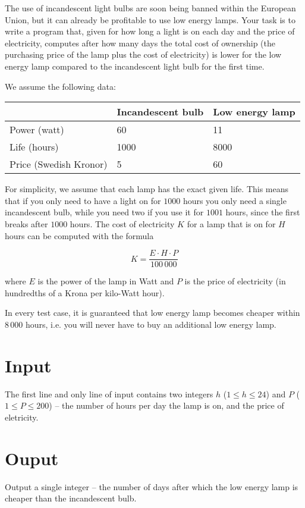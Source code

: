 The use of incandescent light bulbs are soon being banned within the European Union, but it can already be profitable to use low energy lamps.
Your task is to write a program that, given for how long a light is on each day and the price of electricity, computes after how many days the total cost of ownership (the purchasing price of the lamp plus the cost of electricity) is lower for the low energy lamp compared to the incandescent light bulb for the first time.

We assume the following data:
\begin{tabular}{|l|l|l|}
\hline
& Incandescent bulb & Low energy lamp \\ \hline
Power (watt)           & 60                & 11             \\ \hline
Life (hours)           & 1000              & 8000           \\ \hline
Price (Swedish Kronor) & 5                 & 60             \\ \hline
\end{tabular}

For simplicity, we assume that each lamp has the exact given life.
This means that if you only need to have a light on for $1000$ hours you only need a single incandescent bulb, while you need two if you use it for $1001$ hours, since the first breaks after $1000$ hours.
The cost of electricity $K$ for a lamp that is on for $H$ hours can be computed with the formula

$$ K = \frac{E \cdot H \cdot P}{100\,000} $$

where $E$ is the power of the lamp in Watt and $P$ is the price of electricity (in hundredths of a Krona per kilo-Watt hour).

In every test case, it is guaranteed that low energy lamp becomes cheaper within $8\,000$ hours, i.e. you will never have to buy an additional low energy lamp.

\section*{Input}
The first line and only line of input contains two integers $h$ ($1 \le h \le 24$) and $P$ ($1 \le P \le 200$) -- the number of hours per day the lamp is on, and the price of eletricity.

\section*{Ouput}
Output a single integer -- the number of days after which the low energy lamp is cheaper than the incandescent bulb.

